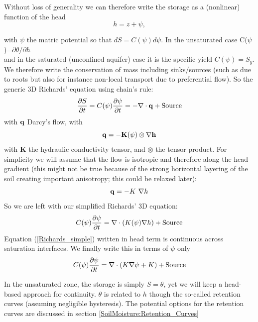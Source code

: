 \documentclass{article}
\begin{document}
Without loss of generality we can therefore write the storage as a (nonlinear) function of the head 
\begin{equation}
     h=z+\psi,
\label{head}
\end{equation}

with $\psi$ the matric potential so that $dS = C(\psi)d\psi$. In the unsaturated case C($\psi$)=$\partial \theta /\partial h$ \\ and in the saturated (unconfined aquifer) case it is the specific yield $C(\psi)=S_y$.
We therefore write the conservation of mass including sinks/sources (such as due to roots but also for instance non-local transport due to preferential flow). 
So the generic 3D Richards' equation using chain's rule:
\begin{equation}
     \frac{\partial S}{\partial t} = C(\psi)\frac{\partial \psi}{\partial t} = -\nabla \cdot {\bf{q}} + {\rm Source}
\label{Richards}
\end{equation}
with $\bf{q}$ Darcy's flow, with 
\begin{equation}
     \bf{q} = - \mathbf{K}(\psi) \otimes \nabla h
\end{equation} with $ \mathbf{K}$ the hydraulic conductivity tensor, and $\otimes$ the tensor product.
For simplicity we will assume that the flow is isotropic and therefore along the head gradient (this might not be true because of the strong horizontal layering of the soil creating important anisotropy; this could be relaxed later):
\begin{equation}
     {\bf{q}} = - K \ \nabla h
\end{equation}
So we are left with our simplified Richards' 3D equation:
\begin{equation}
     C(\psi)\frac{\partial \psi}{\partial t}  = \nabla \cdot \left( {K(\psi) \nabla h} \right) + {\rm Source}
\label{Richards_simple}
\end{equation}
Equation (\ref{Richards_simple}) written in head term is continuous across saturation interfaces.
We finally write this in terms of $\psi$ only
\begin{equation}
     C(\psi)\frac{\partial \psi}{\partial t}  = \nabla \cdot \left( {K \nabla \psi} + K \right) + {\rm Source}
\label{Richards_simple}
\end{equation}


In the unsaturated zone, the storage is simply $S=\theta$, yet we will keep a head-based approach for continuity. $\theta$ is related to $h$ though the so-called retention curves (assuming negligible hysteresis). The potential options for the retention curves are discussed in section \ref{SoilMoisture:Retention_Curves}
\end{document}
